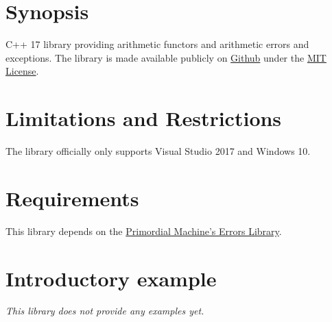 \documentclass[oneside]{book}
\begin{document}
\frontmatter

\begin{titlepage}
\maketitle
\end{titlepage}

\tableofcontents
{}

\mainmatter

\chapter{Synopsis}
C++ 17 library providing arithmetic functors and arithmetic errors and exceptions.
The library is made available publicly on
\href{\GetLibraryRepository}{Github}
under the
\href{\GetLibraryRepository/blob/master/LICENSE}{MIT License}.

\chapter{Limitations and Restrictions}
The library officially only supports Visual Studio 2017 and Windows 10.

\chapter{Requirements}
This library depends on the \href{https://github.com/primordialmachine/errors}{Primordial Machine's Errors Library}.

\chapter{Introductory example}
\textit{\color{orange}This library does not provide any examples yet.}
\end{document}
